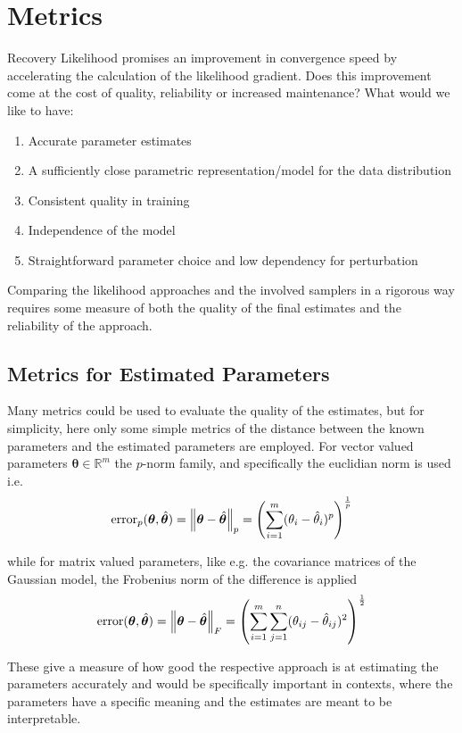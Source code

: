 
\section{Metrics}

Recovery Likelihood promises an improvement in convergence speed by accelerating the calculation of the likelihood gradient.
Does this improvement come at the cost of quality, reliability or increased maintenance?
What would we like to have:
\begin{enumerate}
	\item Accurate parameter estimates
	\item A sufficiently close parametric representation/model for the data distribution
	\item Consistent quality in training
	\item Independence of the model
	\item Straightforward parameter choice and low dependency for perturbation 
\end{enumerate}

Comparing the likelihood approaches and the involved samplers in a rigorous way requires some measure 
of both the quality of the final estimates and the reliability of the approach.


\subsection{Metrics for Estimated Parameters}

Many metrics could be used to evaluate the quality of the estimates, but for simplicity, 
here only some simple metrics of the distance between the known parameters and the estimated parameters are employed.
For vector valued parameters $\bm{\theta} \in \mathbb{R}^m$ the $p$-norm family, and specifically the euclidian norm is used i.e.
\[
	\text{error}_p (\bm{\theta}, \hat{\bm{\theta}}) = \norm[p]{ \bm{\theta} - \hat{\bm{\theta}} } = \left(\sum_{i=1}^m (\theta_i - \hat{\theta}_i)^p \right)^{ \frac{1}{p} }
\]

while for matrix valued parameters, like e.g. the covariance matrices of the Gaussian model, the Frobenius norm of the difference is applied
\[
	\text{error} (\bm{\theta}, \hat{\bm{\theta}}) = \norm[F]{ \bm{\theta} - \hat{\bm{\theta}} } 
	= \left(\sum_{i=1}^m \sum_{j=1}^n (\theta_{i j} - \hat{\theta}_{i j})^2 \right)^{ \frac{1}{2} }
\]

These give a measure of how good the respective approach is at estimating the parameters accurately and would be specifically important in contexts, 
where the parameters have a specific meaning and the estimates are meant to be interpretable.







